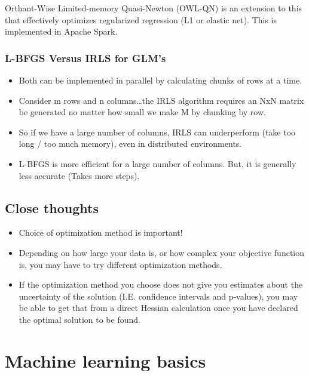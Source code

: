 \documentclass[fontset=fandol,zihao=false,scheme=chinese,heading=true,UTF8]{ctexbook}
\providecommand{\tightlist}{%
  \setlength{\itemsep}{0pt}\setlength{\parskip}{0pt}}
\begin{document}
Orthant-Wise Limited-memory Quasi-Newton (OWL-QN) is an extension to this that effectively optimizes regularized regression (L1 or elastic net). This is implemented in Apache Spark.

\hypertarget{l-bfgs-versus-irls-for-glms}{%
\subsection{L-BFGS Versus IRLS for GLM's}\label{l-bfgs-versus-irls-for-glms}}

\begin{itemize}
\tightlist
\item
  Both can be implemented in parallel by calculating chunks of rows at a time.
\item
  Consider m rows and n columns\ldots{}the IRLS algorithm requires an NxN matrix be generated no matter how small we make M by chunking by row.
\item
  So if we have a large number of columns, IRLS can underperform (take too long / too much memory), even in distributed environments.
\item
  L-BFGS is more efficient for a large number of columns. But, it is generally less accurate (Takes more steps).
\end{itemize}

\hypertarget{close-thoughts}{%
\section{Close thoughts}\label{close-thoughts}}

\begin{itemize}
\tightlist
\item
  Choice of optimization method is important!
\item
  Depending on how large your data is, or how complex your objective function is, you may have to try different optimization methods.
\item
  If the optimization method you choose does not give you estimates about the uncertainty of the solution (I.E. confidence intervals and p-values), you may be able to get that from a direct Hessian calculation once you have declared the optimal solution to be found.
\end{itemize}

\hypertarget{machine-learning-basics}{%
\chapter{Machine learning basics}\label{machine-learning-basics}}
\end{document}
